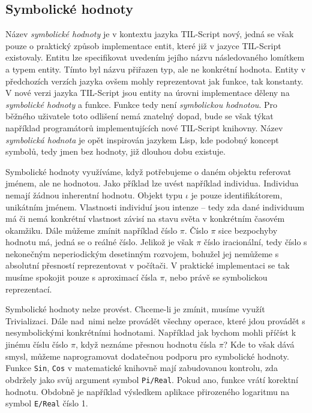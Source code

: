 \subsection{Symbolické hodnoty}\label{symbolic-values}

Název \textit{symbolické hodnoty} je v kontextu jazyka TIL-Script nový, jedná se však pouze o
praktický způsob implementace entit, které již v jazyce TIL-Script existovaly. Entitu lze
specifikovat uvedením jejího názvu následovaného lomítkem a typem entity. Tímto byl názvu přiřazen
typ, ale ne konkrétní hodnota. Entity v předchozích verzích jazyka ovšem mohly reprezentovat jak
funkce, tak konstanty. V nové verzi jazyka TIL-Script jsou entity na úrovni implementace děleny
na \textit{symbolické hodnoty} a funkce. Funkce tedy není \textit{symbolickou hodnotou}.
Pro běžného uživatele toto odlišení nemá znatelný dopad, bude se však týkat například programátorů
implementujících nové TIL-Script knihovny. Název \textit{symbolická hodnota} je opět inspirován
jazykem Lisp, kde podobný koncept symbolů, tedy jmen bez hodnoty, již dlouhou dobu existuje.

Symbolické hodnoty využíváme, když potřebujeme o daném objektu referovat jménem, ale ne hodnotou.
Jako příklad lze uvést například individua. Individua nemají žádnou inherentní hodnotu. Objekt
typu $\iota$ je pouze identifikátorem, unikátním jménem. Vlastnosti individuí jsou intenze -- tedy zda
dané individuum má či nemá konkrétní vlastnost závisí na stavu světa v konkrétním časovém okamžiku.
Dále můžeme zmínit například číslo $\pi$. Číslo $\pi$ sice bezpochyby hodnotu má, jedná se o reálné
číslo. Jelikož je však $\pi$ číslo iracionální, tedy číslo s nekonečným neperiodickým desetinným
rozvojem, bohužel jej nemůžeme s absolutní přesností reprezentovat v počítači. V praktické
implementaci se tak musíme spokojit pouze s aproximací čísla $\pi$, nebo právě se symbolickou
reprezentací.

Symbolické hodnoty nelze provést. Chceme-li je zmínit, musíme využít Trivializaci. Dále nad~nimi
nelze provádět všechny operace, které jdou provádět s nesymbolickými konkrétními hodnotami.
Například jak bychom mohli příčíst k jinému číslu číslo $\pi$, když neznáme přesnou hodnotu čísla
$\pi$? Kde to však dává smysl, můžeme naprogramovat dodatečnou podporu pro symbolické hodnoty.
Funkce \lstinline{Sin}, \lstinline{Cos} v matematické knihovně mají zabudovanou kontrolu, zda
obdržely jako svůj argument symbol \lstinline{Pi/Real}. Pokud ano, funkce vrátí korektní
hodnotu. Obdobně je například výsledkem aplikace přirozeného logaritmu na symbol \lstinline{E/Real}
číslo 1.

